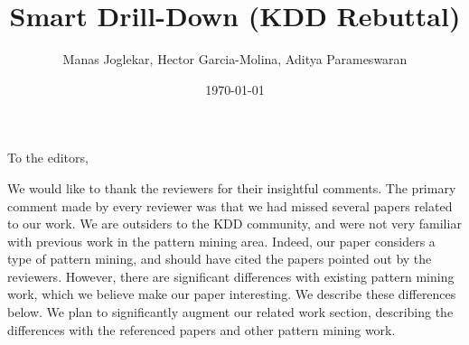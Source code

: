 \documentclass{article}
\date{\today}
\begin{document}
\title{Smart Drill-Down (KDD Rebuttal)}
\author{Manas Joglekar, Hector Garcia-Molina, Aditya Parameswaran}
\maketitle
To the editors,

We would like to thank the reviewers for their insightful comments. The primary comment made by every reviewer was that we had missed several papers related to our work. We are outsiders to the KDD community, and were not very familiar with previous work in the pattern mining area. Indeed, our paper considers a type of pattern mining, and should have cited the papers pointed out by the reviewers. However, there are significant differences with existing pattern mining work, which we believe make our paper interesting. We describe these differences below. We plan to significantly augment our related work section, describing the differences with the referenced papers and other pattern mining work.
\end{document}
